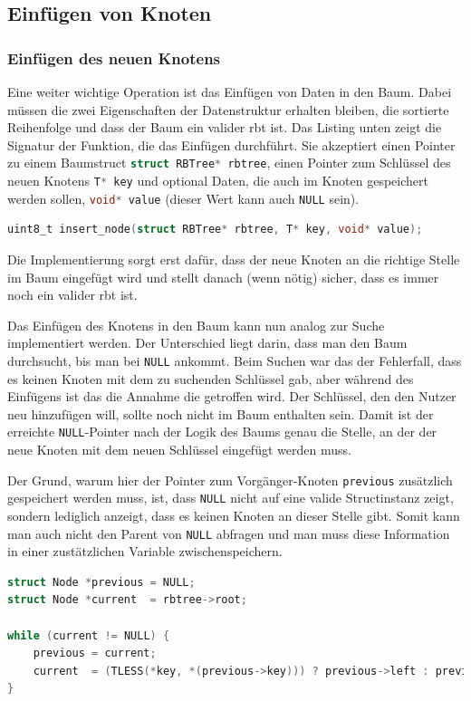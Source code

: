 \documentclass[11pt]{article}
\newcommand{\lstin}[1]{\lstinline[language=C]{#1}}
\begin{document}
\subsection{Einfügen von Knoten}

\subsubsection{Einfügen des neuen Knotens}
Eine weiter wichtige Operation ist das Einfügen von Daten in den Baum. Dabei müssen die zwei Eigenschaften der Datenstruktur erhalten bleiben, die sortierte Reihenfolge und dass der Baum ein valider \gls{rbt} ist.
Das Listing unten zeigt die Signatur der Funktion, die das Einfügen durchführt. Sie akzeptiert einen Pointer zu einem Baumstruct \lstin{struct RBTree* rbtree}, einen Pointer zum Schlüssel des neuen Knotens \lstin{T* key} und optional Daten, die auch im Knoten gespeichert werden sollen, \lstin{void* value} (dieser Wert kann auch \lstin{NULL} sein).

\begin{lstlisting}[language=C]
uint8_t insert_node(struct RBTree* rbtree, T* key, void* value);
\end{lstlisting}

Die Implementierung sorgt erst dafür, dass der neue Knoten an die richtige Stelle im Baum eingefügt wird und stellt danach (wenn nötig) sicher, dass es immer noch ein valider \gls{rbt} ist.

Das Einfügen des Knotens in den Baum kann nun analog zur Suche implementiert werden.
Der Unterschied liegt darin, dass man den Baum durchsucht, bis man bei \lstin{NULL} ankommt.
Beim Suchen war das der Fehlerfall, dass es keinen Knoten mit dem zu suchenden Schlüssel gab, aber während des Einfügens ist das die Annahme die getroffen wird.
Der Schlüssel, den den Nutzer neu hinzufügen will, sollte noch nicht im Baum enthalten sein. Damit ist der erreichte \lstin{NULL}-Pointer nach der Logik des Baums genau die Stelle, an der der neue Knoten mit dem neuen Schlüssel eingefügt werden muss.

Der Grund, warum hier der Pointer zum Vorgänger-Knoten \lstin{previous} zusätzlich gespeichert werden muss, ist,
dass \lstin{NULL} nicht auf eine valide Structinstanz zeigt, sondern lediglich anzeigt, dass es keinen Knoten an dieser Stelle gibt.
Somit kann man auch nicht den Parent von \lstin{NULL} abfragen und man muss diese Information in einer zustätzlichen Variable zwischenspeichern.

\begin{lstlisting}[language=C]
struct Node *previous = NULL;
struct Node *current  = rbtree->root;

while (current != NULL) {
    previous = current;
    current  = (TLESS(*key, *(previous->key))) ? previous->left : previous->right;
}
\end{lstlisting}
\end{document}
